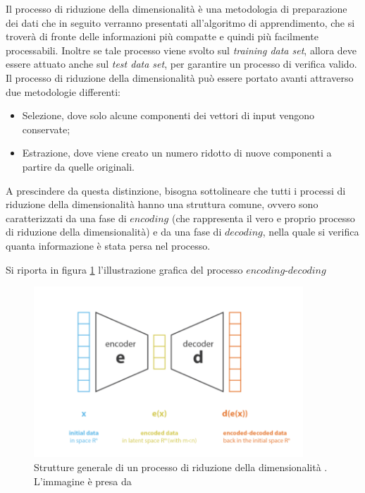 Il processo di riduzione della dimensionalità è una metodologia di preparazione dei dati che in seguito verranno presentati all'algoritmo di apprendimento, che si troverà di fronte delle informazioni più compatte e quindi più facilmente processabili. Inoltre se tale processo viene svolto sul \textit{training data set}, allora deve essere attuato anche sul \textit{test data set}, per garantire un processo di verifica valido.\\
Il processo di riduzione della dimensionalità può essere portato avanti attraverso due metodologie differenti:
\begin{itemize}
	\item Selezione, dove solo alcune componenti dei vettori di input vengono conservate;
	\item Estrazione, dove viene creato un numero ridotto di nuove componenti a partire da quelle originali.
\end{itemize}
A prescindere da questa distinzione, bisogna sottolineare che tutti i processi di riduzione della dimensionalità hanno una struttura comune, ovvero sono caratterizzati da una fase di $\textit{encoding}$ (che rappresenta il vero e proprio processo di riduzione della dimensionalità) e da una fase di $\textit{decoding}$, nella quale si verifica quanta informazione è stata persa nel processo. 

\newpage

Si riporta in figura \ref{encoder-decoder} l'illustrazione grafica del processo $\textit{encoding-decoding}$
\begin{figure}[h!]
	\centering
	\includegraphics[width=0.90\textwidth]{figs/encoder-decoder.png}
	\caption{Strutture generale di un processo di riduzione della dimensionalità . L'immagine è presa da \cite{Understanding_VAEs}}
	\label{encoder-decoder}
\end{figure}

